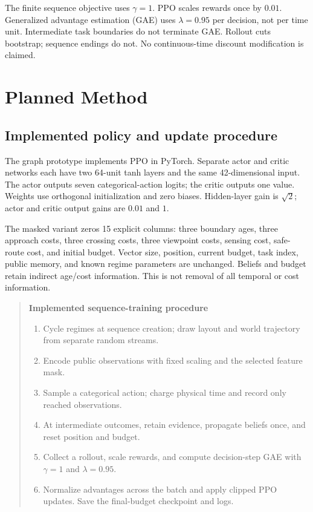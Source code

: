 \documentclass[journal]{IEEEtai}
\begin{document}
The finite sequence objective uses $\gamma=1$. PPO scales rewards once by $0.01$. Generalized advantage estimation (GAE) uses $\lambda=0.95$ per decision, not per time unit. Intermediate task boundaries do not terminate GAE. Rollout cuts bootstrap; sequence endings do not. No continuous-time discount modification is claimed.

\section{Planned Method}
\subsection{Implemented policy and update procedure}
The graph prototype implements PPO in PyTorch. Separate actor and critic networks each have two 64-unit tanh layers and the same 42-dimensional input. The actor outputs seven categorical-action logits; the critic outputs one value. Weights use orthogonal initialization and zero biases. Hidden-layer gain is $\sqrt{2}$; actor and critic output gains are $0.01$ and $1$.

The masked variant zeros 15 explicit columns: three boundary ages, three approach costs, three crossing costs, three viewpoint costs, sensing cost, safe-route cost, and initial budget. Vector size, position, current budget, task index, public memory, and known regime parameters are unchanged. Beliefs and budget retain indirect age/cost information. This is not removal of all temporal or cost information.

\begin{quote}
\textbf{Implemented sequence-training procedure}
\begin{enumerate}
\item Cycle regimes at sequence creation; draw layout and world trajectory from separate random streams.
\item Encode public observations with fixed scaling and the selected feature mask.
\item Sample a categorical action; charge physical time and record only reached observations.
\item At intermediate outcomes, retain evidence, propagate beliefs once, and reset position and budget.
\item Collect a rollout, scale rewards, and compute decision-step GAE with $\gamma=1$ and $\lambda=0.95$.
\item Normalize advantages across the batch and apply clipped PPO updates. Save the final-budget checkpoint and logs.
\end{enumerate}
\end{quote}
\end{document}
